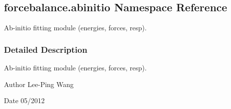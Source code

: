 \hypertarget{namespaceforcebalance_1_1abinitio}{}\subsection{forcebalance.\+abinitio Namespace Reference}
\label{namespaceforcebalance_1_1abinitio}


Ab-\/initio fitting module (energies, forces, resp).  




\subsubsection{Detailed Description}
Ab-\/initio fitting module (energies, forces, resp). 

\begin{DoxyAuthor}{Author}
Lee-\/\+Ping Wang 
\end{DoxyAuthor}
\begin{DoxyDate}{Date}
05/2012 
\end{DoxyDate}
